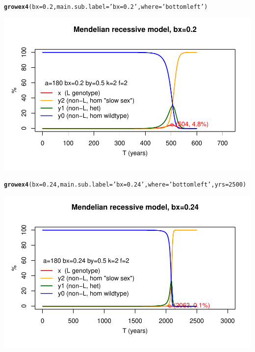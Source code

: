 \documentclass{article}\usepackage[]{graphicx}\usepackage[]{color}
\makeatletter
\def\maxwidth{ %
  \ifdim\Gin@nat@width>\linewidth
    \linewidth
  \else
    \Gin@nat@width
  \fi
}
\newcommand{\hlnum}[1]{\textcolor[rgb]{0.686,0.059,0.569}{#1}}%
\newcommand{\hlstr}[1]{\textcolor[rgb]{0.192,0.494,0.8}{#1}}%
\newcommand{\hlstd}[1]{\textcolor[rgb]{0.345,0.345,0.345}{#1}}%
\newcommand{\hlkwc}[1]{\textcolor[rgb]{0.333,0.667,0.333}{#1}}%
\newcommand{\hlkwd}[1]{\textcolor[rgb]{0.737,0.353,0.396}{\textbf{#1}}}%
\newenvironment{kframe}{%
 \def\at@end@of@kframe{}%
 \ifinner\ifhmode%
  \def\at@end@of@kframe{\end{minipage}}%
  \begin{minipage}{\columnwidth}%
 \fi\fi%
 \def\FrameCommand##1{\hskip\@totalleftmargin \hskip-\fboxsep
 \colorbox{shadecolor}{##1}\hskip-\fboxsep
     \hskip-\linewidth \hskip-\@totalleftmargin \hskip\columnwidth}%
 \MakeFramed {\advance\hsize-\width
   \@totalleftmargin\z@ \linewidth\hsize
   \@setminipage}}%
 {\par\unskip\endMakeFramed%
 \at@end@of@kframe}
\newenvironment{knitrout}{}{} %
\makeatother
\begin{document}
\begin{knitrout}\footnotesize
{}\color{fgcolor}\begin{kframe}
\begin{alltt}
\hlkwd{growex4}\hlstd{(}\hlkwc{bx}\hlstd{=}\hlnum{0.2}\hlstd{,} \hlkwc{main.sub.label}\hlstd{=}\hlstr{'bx=0.2'}\hlstd{,}\hlkwc{where}\hlstd{=}\hlstr{'bottomleft'}\hlstd{)}
\end{alltt}
\end{kframe}

{\centering \includegraphics[width=\maxwidth]{asex-figs-knitr/unnamed-chunk-22-1} 

}



\end{knitrout}

\begin{knitrout}\footnotesize
{}\color{fgcolor}\begin{kframe}
\begin{alltt}
\hlkwd{growex4}\hlstd{(}\hlkwc{bx}\hlstd{=}\hlnum{0.24}\hlstd{,} \hlkwc{main.sub.label}\hlstd{=}\hlstr{'bx=0.24'}\hlstd{,} \hlkwc{where}\hlstd{=}\hlstr{'bottomleft'}\hlstd{,}\hlkwc{yrs}\hlstd{=}\hlnum{2500}\hlstd{)}
\end{alltt}
\end{kframe}

{\centering \includegraphics[width=\maxwidth]{asex-figs-knitr/unnamed-chunk-23-1} 

}



\end{knitrout}
\end{document}
